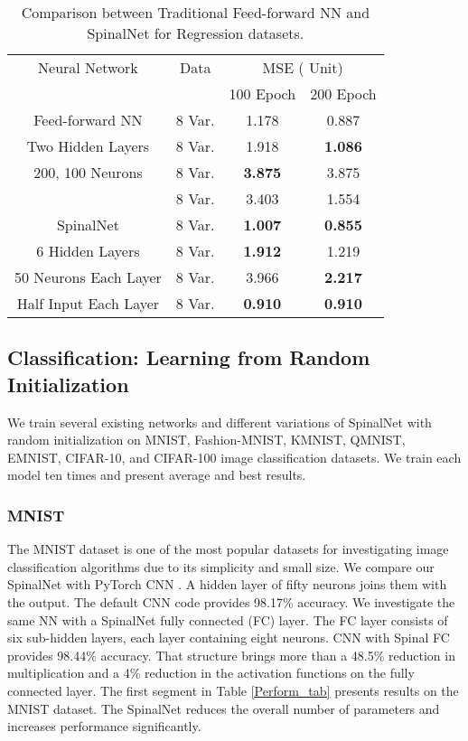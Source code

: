 \documentclass[journal]{IEEEtran}
\begin{document}
\begin{table}
\centering
\caption{Comparison between Traditional Feed-forward NN and SpinalNet for Regression datasets. }
\label{Regression1}
\begin{tabular}{|c|c|c|c|}
\hline
 Neural Network & Data & \multicolumn{2}{|c|}{MSE ( Unit)}    \\ \cline{3-4}
                &      & 100 Epoch & 200 Epoch    \\ \hline 
 Feed-forward NN & 8 Var.  & 1.178&0.887    \\ \cline{2-4} 
 Two Hidden Layers& 8 Var.  &1.918&\bf{1.086}    \\ \cline{2-4}  
 200, 100 Neurons & 8 Var.  & \bf{3.875} &3.875    \\ \cline{2-4} 
 \cite{Regression} & 8 Var.  &3.403 &1.554    \\ \hline 
 
 SpinalNet & 8 Var.  &\bf{1.007}& \bf{0.855}    \\ \cline{2-4} 
 6 Hidden Layers& 8 Var.  & \bf{1.912}&1.219    \\ \cline{2-4}  
 50 Neurons Each Layer & 8 Var.  &3.966 &\bf{2.217}    \\ \cline{2-4} 
 Half Input Each Layer & 8 Var.  & \bf{0.910} &\bf{0.910}    \\ \hline 
 
\end{tabular}
\end{table}

\subsection{Classification: Learning from Random Initialization}
We train several existing networks and different variations of SpinalNet with random initialization on MNIST, Fashion-MNIST, KMNIST, QMNIST, EMNIST, CIFAR-10, and CIFAR-100  image classification datasets. We train each model ten times and present average and best results.


\subsubsection{MNIST}
The MNIST dataset is one of the most popular datasets for investigating image classification algorithms due to its simplicity and small size. We compare our SpinalNet with PyTorch CNN \cite{MNIST_CNN}. A hidden layer of fifty neurons joins them with the output. The default CNN code provides 98.17\% accuracy. We investigate the same NN with a SpinalNet fully connected (FC) layer. The FC layer consists of six sub-hidden layers, each layer containing eight neurons. CNN with Spinal FC provides 98.44\% accuracy. That structure brings more than a 48.5\% reduction in multiplication and a 4\% reduction in the activation functions on the fully connected layer. The first segment in Table \ref{Perform_tab} presents results on the MNIST dataset. The SpinalNet reduces the overall number of parameters and increases performance significantly.
\end{document}

